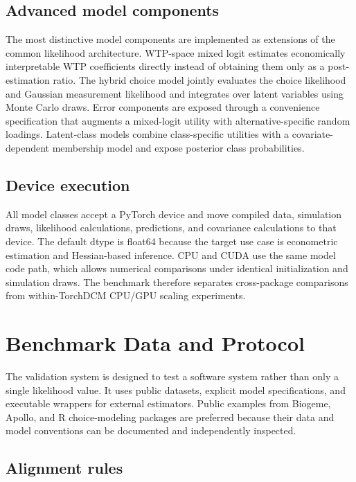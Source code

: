\documentclass[11pt]{article}
\begin{document}
\subsection{Advanced model components}

The most distinctive model components are implemented as extensions of the
common likelihood architecture. WTP-space mixed logit estimates economically
interpretable WTP coefficients directly instead of obtaining them only as a
post-estimation ratio. The hybrid choice model jointly evaluates the choice
likelihood and Gaussian measurement likelihood and integrates over latent
variables using Monte Carlo draws. Error components are exposed through a
convenience specification that augments a mixed-logit utility with
alternative-specific random loadings. Latent-class models combine
class-specific utilities with a covariate-dependent membership model and expose
posterior class probabilities.

\subsection{Device execution}

All model classes accept a PyTorch device and move compiled data, simulation
draws, likelihood calculations, predictions, and covariance calculations to
that device. The default dtype is float64 because the target use case is
econometric estimation and Hessian-based inference. CPU and CUDA use the same
model code path, which allows numerical comparisons under identical
initialization and simulation draws. The benchmark therefore separates
cross-package comparisons from within-TorchDCM CPU/GPU scaling experiments.

\section{Benchmark Data and Protocol}
\label{sec:benchmark_protocol}

The validation system is designed to test a software system rather than only a
single likelihood value. It uses public datasets, explicit model specifications,
and executable wrappers for external estimators. Public examples from Biogeme,
Apollo, and R choice-modeling packages are preferred because their data and
model conventions can be documented and independently inspected.

\subsection{Alignment rules}
\end{document}
